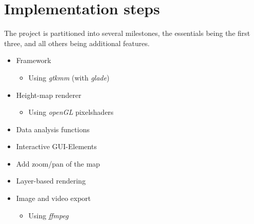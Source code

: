 \documentclass[paper=a4]{proc}
\begin{document}
	\section{Implementation steps}
		The project is partitioned into several milestones, the essentials being the first three, and all others being additional features.
		\begin{itemize}
			\item Framework
			\begin{itemize}
				\item Using \emph{gtkmm} (with \emph{glade})
			\end{itemize}
			\item Height-map renderer
			\begin{itemize}
				\item Using \emph{openGL} pixelshaders
			\end{itemize}
			\item Data analysis functions
			\item Interactive GUI-Elements
			\item Add zoom/pan of the map
			\item Layer-based rendering
			\item Image and video export
			\begin{itemize}
				\item Using \emph{ffmpeg}
			\end{itemize}
		\end{itemize}
\end{document}
